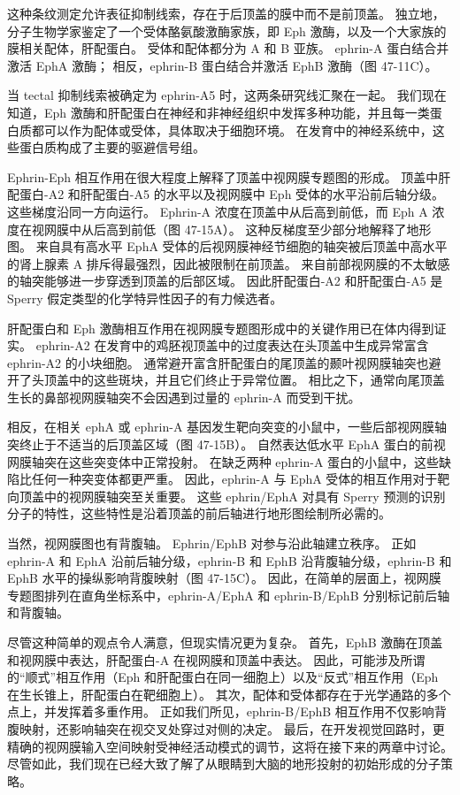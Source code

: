 这种条纹测定允许表征抑制线索，存在于后顶盖的膜中而不是前顶盖。 独立地，分子生物学家鉴定了一个受体酪氨酸激酶家族，即 Eph 激酶，以及一个大家族的膜相关配体，肝配蛋白。 受体和配体都分为 A 和 B 亚族。 ephrin-A 蛋白结合并激活 EphA 激酶； 相反，ephrin-B 蛋白结合并激活 EphB 激酶（图 47-11C）。

当 tectal 抑制线索被确定为 ephrin-A5 时，这两条研究线汇聚在一起。 我们现在知道，Eph 激酶和肝配蛋白在神经和非神经组织中发挥多种功能，并且每一类蛋白质都可以作为配体或受体，具体取决于细胞环境。 在发育中的神经系统中，这些蛋白质构成了主要的驱避信号组。

Ephrin-Eph 相互作用在很大程度上解释了顶盖中视网膜专题图的形成。 顶盖中肝配蛋白-A2 和肝配蛋白-A5 的水平以及视网膜中 Eph 受体的水平沿前后轴分级。 这些梯度沿同一方向运行。 Ephrin-A 浓度在顶盖中从后高到前低，而 Eph A 浓度在视网膜中从后高到前低（图 47-15A）。 这种反梯度至少部分地解释了地形图。 来自具有高水平 EphA 受体的后视网膜神经节细胞的轴突被后顶盖中高水平的肾上腺素 A 排斥得最强烈，因此被限制在前顶盖。 来自前部视网膜的不太敏感的轴突能够进一步穿透到顶盖的后部区域。 因此肝配蛋白-A2 和肝配蛋白-A5 是 Sperry 假定类型的化学特异性因子的有力候选者。

肝配蛋白和 Eph 激酶相互作用在视网膜专题图形成中的关键作用已在体内得到证实。 ephrin-A2 在发育中的鸡胚视顶盖中的过度表达在头顶盖中生成异常富含 ephrin-A2 的小块细胞。 通常避开富含肝配蛋白的尾顶盖的颞叶视网膜轴突也避开了头顶盖中的这些斑块，并且它们终止于异常位置。 相比之下，通常向尾顶盖生长的鼻部视网膜轴突不会因遇到过量的 ephrin-A 而受到干扰。

相反，在相关 ephA 或 ephrin-A 基因发生靶向突变的小鼠中，一些后部视网膜轴突终止于不适当的后顶盖区域（图 47-15B）。 自然表达低水平 EphA 蛋白的前视网膜轴突在这些突变体中正常投射。 在缺乏两种 ephrin-A 蛋白的小鼠中，这些缺陷比任何一种突变体都更严重。 因此，ephrin-A 与 EphA 受体的相互作用对于靶向顶盖中的视网膜轴突至关重要。 这些 ephrin/EphA 对具有 Sperry 预测的识别分子的特性，这些特性是沿着顶盖的前后轴进行地形图绘制所必需的。

当然，视网膜图也有背腹轴。 Ephrin/EphB 对参与沿此轴建立秩序。 正如 ephrin-A 和 EphA 沿前后轴分级，ephrin-B 和 EphB 沿背腹轴分级，ephrin-B 和 EphB 水平的操纵影响背腹映射（图 47-15C）。 因此，在简单的层面上，视网膜专题图排列在直角坐标系中，ephrin-A/EphA 和 ephrin-B/EphB 分别标记前后轴和背腹轴。

尽管这种简单的观点令人满意，但现实情况更为复杂。 首先，EphB 激酶在顶盖和视网膜中表达，肝配蛋白-A 在视网膜和顶盖中表达。 因此，可能涉及所谓的“顺式”相互作用（Eph 和肝配蛋白在同一细胞上）以及“反式”相互作用（Eph 在生长锥上，肝配蛋白在靶细胞上）。 其次，配体和受体都存在于光学通路的多个点上，并发挥着多重作用。 正如我们所见，ephrin-B/EphB 相互作用不仅影响背腹映射，还影响轴突在视交叉处穿过对侧的决定。 最后，在开发视觉回路时，更精确的视网膜输入空间映射受神经活动模式的调节，这将在接下来的两章中讨论。 尽管如此，我们现在已经大致了解了从眼睛到大脑的地形投射的初始形成的分子策略。


